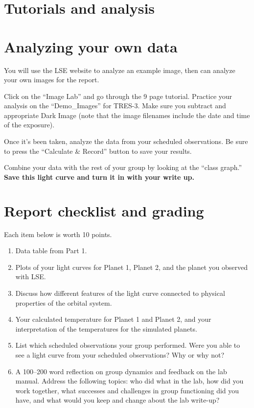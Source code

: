 \section{Tutorials and analysis}



\section{Analyzing your own data}

You will use the LSE website to analyze an example image, then can analyze your own images for the report.

\begin{steps}
	\item Click on the “Image Lab” and go through the 9 page tutorial. Practice
your analysis on the “Demo\_Images” for TRES-3. Make sure you subtract
and appropriate Dark Image (note that the image filenames include the
date and time of the exposure).

	\item Once it’s been taken, analyze the data from your scheduled
observations. Be sure to press the “Calculate \& Record” button to save
your results.

	\item Combine your data with the rest of your group by looking at the “class graph.” \textbf{Save this light curve and turn it in with your write up.}

\end{steps}

\section{Report checklist and grading}

Each item below is worth 10 points.

\begin{enumerate}
	\item Data table from Part 1.
	
	\item Plots of your light curves for Planet 1, Planet 2, and the planet you observed with LSE. 
	
	\item Discuss how different features of the light curve connected to physical
	properties of the orbital system.
	
	\item Your calculated temperature for Planet 1 and Planet 2, and your interpretation of the
	temperatures for the simulated planets.
	
	\item List which scheduled observations your group performed. Were you able to see a light curve from your scheduled observations? Why or why not?
	
	\item A 100--200 word reflection on group dynamics and feedback on the lab manual. Address the following topics: who did what in the lab, how did you work together, what successes and challenges in group functioning did you have, and what would you keep and change about the lab write-up?
\end{enumerate}